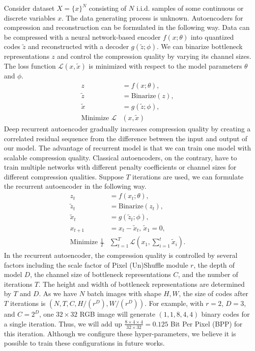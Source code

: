 \documentclass[10pt,twocolumn,letterpaper]{article}
\begin{document}
Consider dataset $X = \{x\}^{N}$ consisting of $N$ i.i.d. samples of some continuous or discrete variables $x$. The data generating process is unknown. Autoencoders for compression and reconstruction can be formulated in the following way. Data can be compressed with a neural network-based encoder $f(x;\theta)$ into quantized codes $\tilde{z}$ and reconstructed with a decoder $g(\tilde{z};\phi)$. We can binarize bottleneck representations $z$ and control the compression quality by varying its channel sizes. The loss function $\mathcal{L}(x,\tilde{x})$ is minimized with respect to the model parameters $\theta$ and $\phi$.
\begin{align}
z &= f(x;\theta),\\
\tilde{z} &= \text{Binarize}(z),\\
\tilde{x} &= g(\tilde{z};\phi),\\
\text{Minimize } \mathcal{L}&(x,\tilde{x})
\end{align}
Deep recurrent autoencoder gradually increases compression quality by creating a correlated residual sequence from the difference between the input and output of our model. The advantage of recurrent model is that we can train one model with scalable compression quality. Classical autoencoders, on the contrary, have to train multiple networks with different penalty coefficients or channel sizes for different compression qualities. Suppose $T$ iterations are used, we can formulate the recurrent autoencoder in the following way.
\begin{align}
z_t &= f(x_t;\theta),\\
\tilde{z}_t &= \text{Binarize}(z_t),\\
\tilde{x}_t &= g(\tilde{z}_t;\phi),\\
x_{t+1} &= x_t-\tilde{x}_t\text{, }\tilde{x}_1=0,\\
\text{Minimize } \frac{1}{T}&\sum_{t=1}^{T}\mathcal{L}(x_1,\sum_{i=1}^{t}\tilde{x}_i).
\end{align}
In the recurrent autoencoder, the compression quality is controlled by several factors including the scale factor of Pixel (Un)Shuffle module $r$, the depth of model $D$, the channel size of bottleneck representations $C$, and the number of iterations $T$. The height and width of bottleneck representations are determined by $T$ and $D$. As we have $N$ batch images with shape $H,W$, the size of codes after $T$ iterations is $(N,T,C,H/(r^D),W/(r^D))$. For example, with $r=2$, $D=3$, and $C=2^D$, one $32 \times 32$ RGB image will generate $(1,1,8,4,4)$ binary codes for a single iteration. Thus, we will add up $\frac{8
\times4\times4}{32\times32} = 0.125$ Bit Per Pixel (BPP) for this iteration. Although we configure these hyper-parameters, we believe it is possible to train these configurations in future works.
\end{document}
